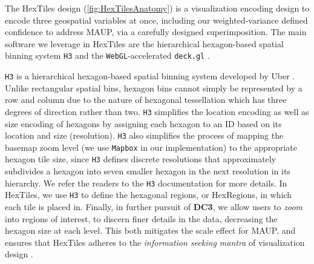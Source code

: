 The HexTiles design (\cref{fig:HexTilesAnatomy}) is a visualization encoding design to encode three geospatial variables at once, including our weighted-variance defined confidence to address MAUP, via a carefully designed superimposition.
%
The main software we leverage in HexTiles are the hierarchical hexagon-based spatial binning system \texttt{H3} \cite{uberh3} and the \texttt{WebGL}-accelerated \texttt{deck.gl} \cite{wang_deckgl_2019}.

\texttt{H3} is a hierarchical hexagon-based spatial binning system developed by Uber \cite{uberh3}. 
%
Unlike rectangular spatial bins, hexagon bins cannot simply be represented by a row and column due to the nature of hexagonal tessellation which has three degrees of direction rather than two. 
%
\texttt{H3} simplifies the location encoding as well as size encoding of hexagons by assigning each hexagon to an ID based on its location and size (resolution).
%
\texttt{H3} also simplifies the process of mapping the basemap zoom level (we use \texttt{Mapbox} in our implementation) to the appropriate hexagon tile size, since \texttt{H3} defines discrete resolutions that approximately subdivides a hexagon into seven smaller hexagon in the next resolution in its hierarchy. 
%
We refer the readers to the \texttt{H3} documentation \cite{uberh3} for more details.
%
In HexTiles, we use \texttt{H3} to define the hexagonal regions, or HexRegions, in which each tile is placed in.
%
Finally, in further pursuit of \textbf{DC3}, we allow users to \textit{zoom} into regions of interest, to discern finer details in the data, decreasing the hexagon size at each level.
%
This both mitigates the scale effect for MAUP, and ensures that HexTiles adheres to the \textit{information seeking mantra} of visualization design \cite{shneiderman_eyes_1996}. 
